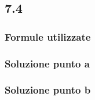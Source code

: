\documentclass[../../main.tex]{subfiles}
\begin{document}
\subsection*{7.4}
\subsubsection*{Formule utilizzate}
\subsubsection*{Soluzione punto a}
\subsubsection*{Soluzione punto b}
\newpage
\end{document}

